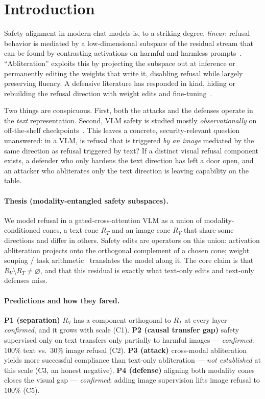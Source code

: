 \documentclass[11pt]{article}
\begin{document}
\section{Introduction}
Safety alignment in modern chat models is, to a striking degree, \emph{linear}:
refusal behavior is mediated by a low-dimensional subspace of the residual stream
that can be found by contrasting activations on harmful and harmless
prompts~\cite{arditi2024refusal,wollschlager2025cones}. ``Abliteration'' exploits
this by projecting the subspace out at inference or permanently editing the weights
that write it, disabling refusal while largely preserving fluency. A defensive
literature has responded in kind, hiding or rebuilding the refusal direction with
weight edits and fine-tuning~\cite{amra2026,deeprefusal2025,extendedrefusal2025}.

Two things are conspicuous. First, both the attacks and the defenses operate in the
\emph{text} representation. Second, VLM safety is studied mostly
\emph{observationally} on off-the-shelf checkpoints~\cite{mmcollapse2026,mmrefusal2026}.
This leaves a concrete, security-relevant question unanswered: in a VLM, is refusal
that is triggered \emph{by an image} mediated by the same direction as refusal
triggered by text? If a distinct visual refusal component exists, a defender who
only hardens the text direction has left a door open, and an attacker who abliterates
only the text direction is leaving capability on the table.

\paragraph{Thesis (modality-entangled safety subspaces).}
We model refusal in a gated-cross-attention VLM as a union of
modality-conditioned cones, a text cone $R_T$ and an image cone $R_V$ that share
some directions and differ in others. Safety edits are operators on this union:
activation abliteration projects onto the orthogonal complement of a chosen cone;
weight souping / task arithmetic~\cite{wortsman2022soup,ilharco2023taskarithmetic}
translates the model along it. The core claim is that
$R_V\setminus R_T\neq\varnothing$, and that this residual is exactly what text-only
edits and text-only defenses miss.

\paragraph{Predictions and how they fared.}
\textbf{P1 (separation)} $R_V$ has a component orthogonal to $R_T$ at every layer
--- \emph{confirmed}, and it grows with scale (C1). \textbf{P2 (causal transfer gap)}
safety supervised only on text transfers only partially to harmful images ---
\emph{confirmed}: $100\%$ text vs.\ $30\%$ image refusal (C2). \textbf{P3 (attack)}
cross-modal abliteration yields more successful compliance than text-only abliteration
--- \emph{not established} at this scale (C3, an honest negative). \textbf{P4 (defense)}
aligning both modality cones closes the visual gap --- \emph{confirmed}: adding image
supervision lifts image refusal to $100\%$ (C5).
\end{document}
